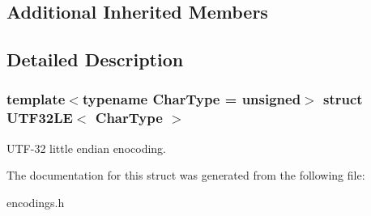 \subsection*{Additional Inherited Members}


\subsection{Detailed Description}
\subsubsection*{template$<$typename Char\+Type = unsigned$>$\newline
struct U\+T\+F32\+L\+E$<$ Char\+Type $>$}

U\+T\+F-\/32 little endian enocoding. 

The documentation for this struct was generated from the following file\+:\begin{DoxyCompactItemize}
\item 
encodings.\+h\end{DoxyCompactItemize}
